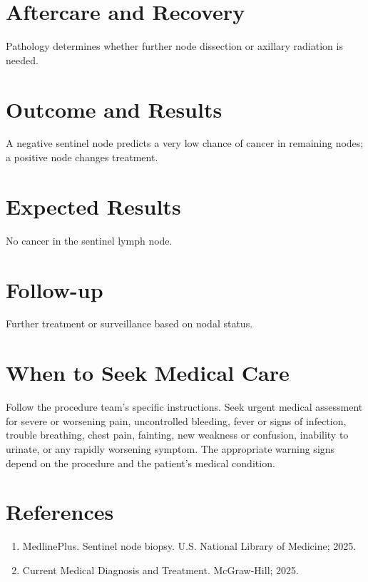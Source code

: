 \section*{Aftercare and Recovery}
Pathology determines whether further node dissection or axillary radiation is needed.

\section*{Outcome and Results}
A negative sentinel node predicts a very low chance of cancer in remaining nodes; a positive node changes treatment.

\section*{Expected Results}
No cancer in the sentinel lymph node.

\section*{Follow-up}
Further treatment or surveillance based on nodal status.

\section*{When to Seek Medical Care}
Follow the procedure team's specific instructions. Seek urgent medical assessment for severe or worsening pain, uncontrolled bleeding, fever or signs of infection, trouble breathing, chest pain, fainting, new weakness or confusion, inability to urinate, or any rapidly worsening symptom. The appropriate warning signs depend on the procedure and the patient's medical condition.

\section*{References}
\begin{enumerate}
  \item MedlinePlus. Sentinel node biopsy. U.S. National Library of Medicine; 2025.
  \item Current Medical Diagnosis and Treatment. McGraw-Hill; 2025.
\end{enumerate}

\clearpage

